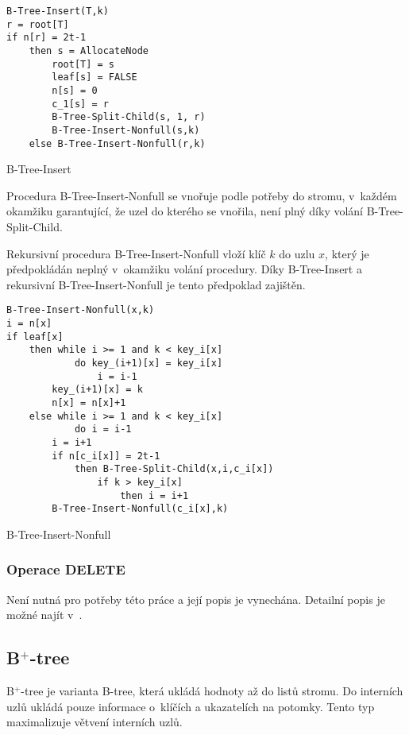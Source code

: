 \begin{algorithm}[t]
\begin{lstlisting}
B-Tree-Insert(T,k)
r = root[T]
if n[r] = 2t-1
	then s = AllocateNode
		root[T] = s
		leaf[s] = FALSE
		n[s] = 0
		c_1[s] = r
		B-Tree-Split-Child(s, 1, r)
		B-Tree-Insert-Nonfull(s,k)
	else B-Tree-Insert-Nonfull(r,k)
\end{lstlisting}


\caption{B-Tree-Insert}
\end{algorithm}


Procedura B-Tree-Insert-Nonfull se vnořuje podle potřeby do stromu,
v~každém okamžiku garantující, že uzel do kterého se vnořila, není
plný díky volání B-Tree-Split-Child\@.

Rekursivní procedura B-Tree-Insert-Nonfull vloží klíč $k$ do uzlu
$x$, který je předpokládán neplný v~okamžiku volání procedury\@.
Díky B-Tree-Insert a rekursivní B-Tree-Insert-Nonfull je tento předpoklad
zajištěn\@.

\begin{algorithm}[t]
\begin{lstlisting}
B-Tree-Insert-Nonfull(x,k)
i = n[x]
if leaf[x]
	then while i >= 1 and k < key_i[x]
			do key_(i+1)[x] = key_i[x]
				i = i-1
		key_(i+1)[x] = k
		n[x] = n[x]+1
	else while i >= 1 and k < key_i[x]
			do i = i-1
		i = i+1
		if n[c_i[x]] = 2t-1
			then B-Tree-Split-Child(x,i,c_i[x])
				if k > key_i[x]
					then i = i+1
		B-Tree-Insert-Nonfull(c_i[x],k)
\end{lstlisting}


\caption{B-Tree-Insert-Nonfull}
\end{algorithm}



\subsubsection{Operace DELETE}

Není nutná pro potřeby této práce a její popis je vynechána\@. Detailní
popis je možné najít v~\cite{Cormen:2001:IA:580470}\@.


\subsection{B$^{\text{+}}$-tree\label{sec:B-plus-tree}}

B$^{\text{+}}$-tree je varianta B-tree, která ukládá hodnoty až do
listů stromu. Do interních uzlů ukládá pouze informace o~klíčích
a ukazatelích na potomky. Tento typ maximalizuje větvení interních
uzlů.

